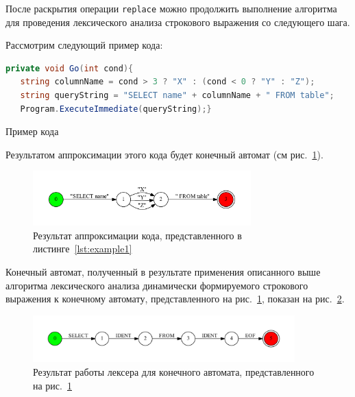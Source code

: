 После раскрытия операции \verb|replace| можно продолжить выполнение алгоритма для проведения лексического анализа строкового выражения со следующего шага. 

Рассмотрим следующий пример кода:

\begin{listing}[H]
    \begin{lstlisting}[language=csharp]
 private void Go(int cond){
   string columnName = cond > 3 ? "X" : (cond < 0 ? "Y" : "Z");
   string queryString = "SELECT name" + columnName + " FROM table";
   Program.ExecuteImmediate(queryString);}
    \end{lstlisting}
\caption{Пример кода}
\label{lst:example1}
\end{listing}

Результатом аппроксимации этого кода будет конечный автомат (см рис.~\ref{fig:example_appr}).

\begin{figure}[H]
\begin{center}
\includegraphics[width=0.75\textwidth]{Polubelova/tsql_test}
\caption{Результат аппроксимации кода, представленного в листинге~\ref{lst:example1}}
\label{fig:example_appr} 
\end{center}
\end{figure}

Конечный автомат, полученный в результате применения описанного выше алгоритма лексического анализа динамически формируемого строкового выражения к конечному автомату, представленного на рис.~\ref{fig:example_appr}, показан на рис.~\ref{fig:example_lexer}.

\begin{figure}[h!]
\begin{center}
\includegraphics[width=0.9\textwidth]{Polubelova/tsql_test_appr}
\caption{Результат работы лексера для конечного автомата, представленного на рис.~\ref{fig:example_appr}}
\label{fig:example_lexer} 
\end{center}
\end{figure}

